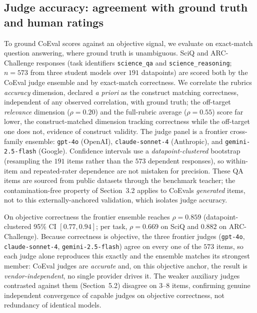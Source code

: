 \subsection{Judge accuracy: agreement with ground truth and human ratings}\label{judge-accuracy-agreement-with-ground-truth-and-human-ratings}

To ground CoEval scores against an objective signal, we evaluate on exact-match question answering, where ground
truth is unambiguous. SciQ and ARC-Challenge responses (task identifiers \texttt{science\_qa} and \texttt{science\_reasoning}; \(n=573\) from three student models over \(191\) datapoints)
are scored both by the CoEval judge ensemble and by exact-match correctness. We correlate the rubric\textquotesingle s \emph{accuracy}
dimension, declared \emph{a priori} as the construct matching correctness, independent of any observed
correlation, with ground truth; the off-target \emph{relevance} dimension
(\(\rho = 0.20\)) and the full-rubric average (\(\rho = 0.55\)) score far lower, the construct-matched dimension
tracking correctness while the off-target one does not, evidence of construct validity. The judge panel is a frontier cross-family ensemble: \texttt{gpt-4o} (OpenAI),
\texttt{claude-sonnet-4} (Anthropic), and \texttt{gemini-2.5-flash} (Google). Confidence intervals use a
\emph{datapoint-clustered} bootstrap (resampling the \(191\) items rather than the \(573\) dependent responses), so
within-item and repeated-rater dependence are not mistaken for precision. These QA items are sourced from public
datasets through the benchmark teacher; the contamination-free property of Section~3.2 applies to CoEval\textquotesingle s
\emph{generated} items, not to this externally-anchored validation, which isolates judge accuracy.

On objective correctness the frontier ensemble reaches \(\rho = 0.859\) (datapoint-clustered 95\% CI \([0.77, 0.94]\);
per task, \(\rho = 0.669\) on SciQ and \(0.882\) on ARC-Challenge). Because correctness is objective, the three frontier
judges (\texttt{gpt-4o}, \texttt{claude-sonnet-4}, \texttt{gemini-2.5-flash}) agree on every one of the
\(573\) items, so each judge alone reproduces this exactly and the ensemble matches its strongest member: CoEval judges
are \emph{accurate} and, on this objective anchor, the result is \emph{vendor-independent}, no single provider drives it. The weaker
auxiliary judges contrasted against them (Section~5.2) disagree on 3--8 items, confirming genuine independent
convergence of capable judges on objective correctness, not redundancy of identical models.

